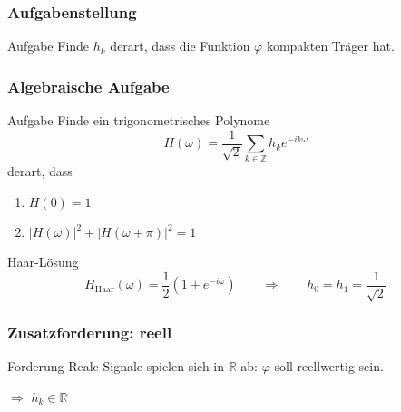 %
%
%


%
%
%
\begin{frame}
\frametitle{Aufgabenstellung}
\begin{block}{Aufgabe}
Finde $h_k$ derart, dass die Funktion $\varphi$ kompakten Träger hat.
\end{block}
\end{frame}

%
%
\begin{frame}
\frametitle{Algebraische Aufgabe}

\begin{block}{Aufgabe}
Finde ein trigonometrisches Polynome
\[
H(\omega) = \frac{1}{\sqrt{2}}\sum_{k\in\mathbb Z} h_ke^{-ik\omega}
\]
derart, dass
\begin{enumerate}
\item $H(0)=1$
\item $|H(\omega)|^2+|H(\omega+\pi)|^2 = 1$
\end{enumerate}
\end{block}

\begin{block}{Haar-Lösung}
\[
H_{\text{Haar}}(\omega) = \frac12(1+e^{-i\omega})
\qquad\Rightarrow\qquad
h_0=h_1=\frac1{\sqrt{2}}
\]
\end{block}

\end{frame}

%
% 
%
\begin{frame}
\frametitle{Zusatzforderung: reell}
\begin{block}{Forderung}
Reale Signale spielen sich in $\mathbb R$ ab: $\varphi$ soll reellwertig
sein.
\end{block}
$\Rightarrow$ $h_k\in\mathbb R$

\]

\end{frame}

